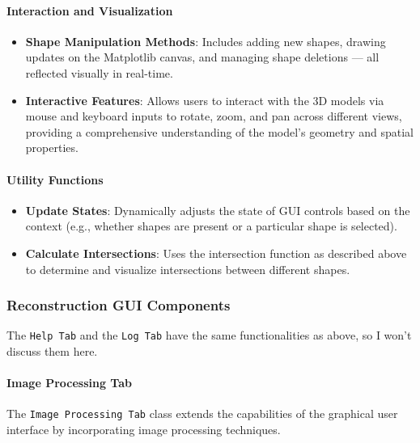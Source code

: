 \documentclass[../main.tex]{subfiles}
\begin{document}
\paragraph{Interaction and Visualization}
\begin{itemize}
    \setlength{\itemsep}{0.1mm}
    \item \textbf{Shape Manipulation Methods}: Includes adding new shapes, drawing updates on the Matplotlib canvas, and managing shape deletions — all reflected visually in real-time.
    \item \textbf{Interactive Features}: Allows users to interact with the 3D models via mouse and keyboard inputs to rotate, zoom, and pan across different views, providing a comprehensive understanding of the model's geometry and spatial properties.
\end{itemize}
\vspace{-15pt}
\paragraph{Utility Functions}
\begin{itemize}
    \item \textbf{Update States}: Dynamically adjusts the state of GUI controls based on the context (e.g., whether shapes are present or a particular shape is selected).
    \item \textbf{Calculate Intersections}: Uses the intersection function as described above to determine and visualize intersections between different shapes.
\end{itemize}
\vspace{-15pt}
\subsubsection{Reconstruction GUI Components}
\vspace{-8pt}
The \texttt{Help Tab} and the \texttt{Log Tab} have the same functionalities as above, so I won't discuss them here.
\vspace{-15pt}
\paragraph{Image Processing Tab}
The \texttt{Image Processing Tab} class extends the capabilities of the graphical user interface by incorporating image processing techniques.
\end{document}
